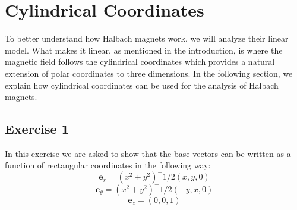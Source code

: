 \documentclass{article}
\begin{document}
\section{Cylindrical Coordinates}
To better understand how Halbach magnets work, we will analyze their linear model. What makes it linear, as mentioned in the introduction, is where the magnetic field follows the cylindrical coordinates which provides a natural extension of polar coordinates to three dimensions. In the following section, we explain how cylindrical coordinates can be used for the analysis of Halbach magnets. 

\subsection{Exercise 1}
In this exercise we are asked to show that the base vectors can be written as a function of rectangular coordinates in the following way:
\begin{equation}
    \mathbf{e}_r = (x^2+y^2)^-1/2 (x,y,0)
\end{equation}
\begin{equation}
    \mathbf{e}_\theta = (x^2+y^2)^-1/2 (-y,x,0)
\end{equation}
\begin{equation}
    \mathbf{e}_z = (0,0,1)
\end{equation}
\end{document}
